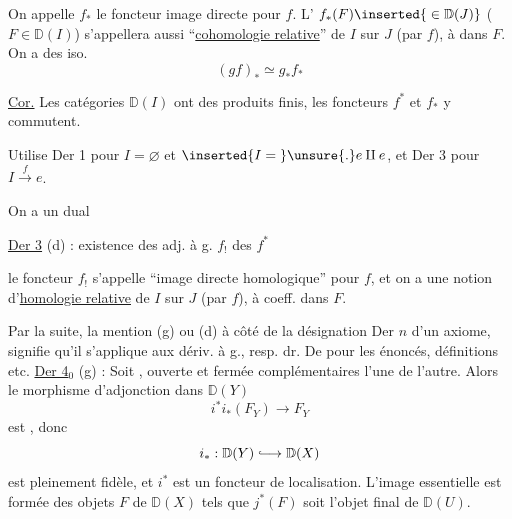 On appelle $f_*$ le foncteur image directe  pour $f$. L' $f_*(F)\inserted{{}\in\mathbb D(J)}$ ($F\in\mathbb D(I)$) s'appellera aussi   ``\uline{cohomologie relative}'' de $I$ sur $J$ (par $f$), à  dans $F$. On a des iso. 
\[
 (gf)_*\simeq g_*f_*
\]

\uline{Cor.} Les catégories $\mathbb D(I)$ ont des produits finis, les foncteurs $f^*$ et $f_*$ y commutent.

Utilise Der 1  pour $I=\varnothing$ et $\inserted{I={}}\unsure{.}e\amalg e$, et Der 3 pour $I\xrightarrow{f}e$.

On a un   dual

\uline{Der 3} (d) : existence des adj. à g. $f_!$ des $f^*$

le foncteur $f_!$ s'appelle ``image directe homologique'' pour $f$, et on a une notion d'\uline{homologie relative} de $I$ sur $J$ (par $f$), à coeff. dans $F$.

Par la suite, la mention (g) ou (d) à côté de la désignation Der $n$ d'un axiome, signifie qu'il s'applique aux dériv. à g., resp.  dr. De  pour les énoncés, définitions etc.
\uline{Der 4}$_0$ (g) : Soit
,  ouverte et fermée complémentaires l'une de l'autre. Alors le morphisme d'adjonction dans $\mathbb D(Y)$
\[
 i^*i_*(F_Y)\longrightarrow F_Y
\]
est  , donc 
\[
 i_*:\mathbb D(Y)\lhook\joinrel\longrightarrow\mathbb D(X)
\]
est pleinement fidèle, et $i^*$ est un foncteur de localisation.  L'image essentielle  est formée des objets $F$ de $\mathbb D(X)$ tels que $j^*(F)$ soit l'objet final de $\mathbb D(U)$.

